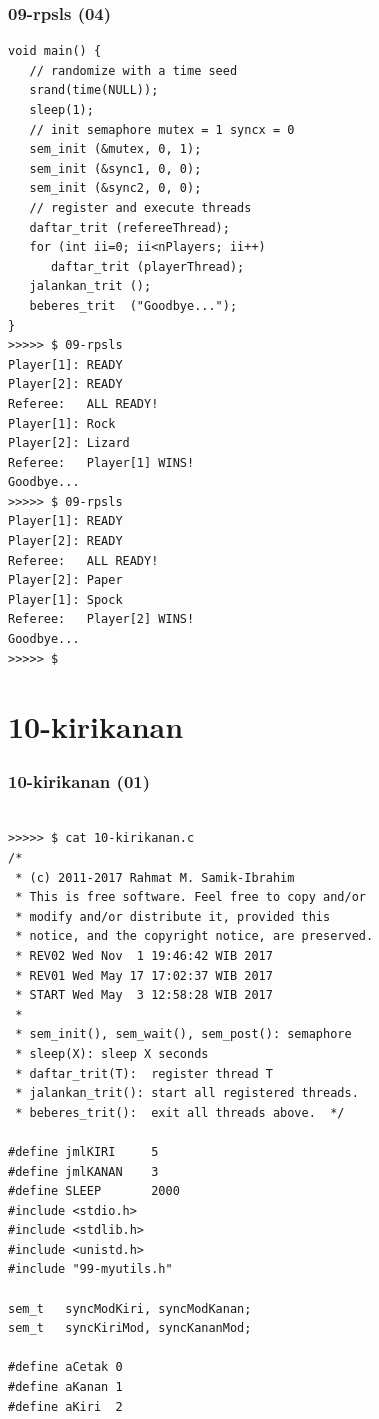 \documentclass[aspectratio=169, xcolor=table, notheorems, hyperref={pdfpagelabels=false}]{beamer}
\begin{document}
\begin{frame}[fragile]
\frametitle{09-rpsls (04)}
\begin{lstlisting}[basicstyle=\ttfamily\tiny]
void main() {
   // randomize with a time seed
   srand(time(NULL));          
   sleep(1);
   // init semaphore mutex = 1 syncx = 0
   sem_init (&mutex, 0, 1);    
   sem_init (&sync1, 0, 0);
   sem_init (&sync2, 0, 0);
   // register and execute threads
   daftar_trit (refereeThread);
   for (int ii=0; ii<nPlayers; ii++)
      daftar_trit (playerThread);
   jalankan_trit ();
   beberes_trit  ("Goodbye...");
}
>>>>> $ 09-rpsls 
Player[1]: READY
Player[2]: READY
Referee:   ALL READY!
Player[1]: Rock
Player[2]: Lizard
Referee:   Player[1] WINS!
Goodbye...
>>>>> $ 09-rpsls 
Player[1]: READY
Player[2]: READY
Referee:   ALL READY!
Player[2]: Paper
Player[1]: Spock
Referee:   Player[2] WINS!
Goodbye...
>>>>> $

\end{lstlisting}
\end{frame}

\section{10-kirikanan}
\begin{frame}[fragile]
\frametitle{10-kirikanan (01)}
\begin{lstlisting}[basicstyle=\ttfamily\tiny]

>>>>> $ cat 10-kirikanan.c
/* 
 * (c) 2011-2017 Rahmat M. Samik-Ibrahim
 * This is free software. Feel free to copy and/or 
 * modify and/or distribute it, provided this 
 * notice, and the copyright notice, are preserved. 
 * REV02 Wed Nov  1 19:46:42 WIB 2017
 * REV01 Wed May 17 17:02:37 WIB 2017
 * START Wed May  3 12:58:28 WIB 2017
 *
 * sem_init(), sem_wait(), sem_post(): semaphore
 * sleep(X): sleep X seconds
 * daftar_trit(T):  register thread T
 * jalankan_trit(): start all registered threads.
 * beberes_trit():  exit all threads above.  */

#define jmlKIRI     5
#define jmlKANAN    3
#define SLEEP       2000
#include <stdio.h>
#include <stdlib.h>
#include <unistd.h>
#include "99-myutils.h"

sem_t   syncModKiri, syncModKanan;
sem_t   syncKiriMod, syncKananMod;

#define aCetak 0
#define aKanan 1
#define aKiri  2

\end{lstlisting}
\end{frame}
\end{document}
